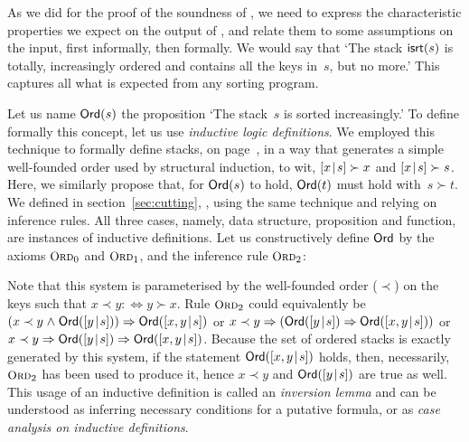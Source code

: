 As we did for the proof of the soundness of 
, we need to express the characteristic
properties we expect on the output of , and relate them to
some assumptions on the input, first informally, then formally. We
would say that `The stack \(\textsf{isrt}(s)\)
is totally, increasingly ordered and contains all the keys in~\(s\),
but no more.'  This captures all what is expected from any sorting
program.

Let us name \(\textsf{Ord}({s})\) the
proposition `The stack~\(s\) is sorted increasingly.' To define
formally this concept, let us use \emph{inductive logic
  definitions}. We employed this
technique to formally define stacks, on page~\pageref{def:stack}, in a
way that generates a simple well\hyp{}founded order used by structural
induction, to wit, \([{x}\!\mid\!{s}] \succ x\) and \([{x}\!\mid\!{s}] \succ
s\). Here, we similarly propose that, for \(\textsf{Ord}({s})\) to hold,
\(\textsf{Ord}({t})\) must hold with~\(s \succ t\). We defined 
in section~\ref{sec:cutting}, , using the same
technique and relying on inference rules. All three cases, namely,
data structure, proposition and function, are instances of inductive
definitions. Let us constructively define \(\textsf{Ord}\) by the
axioms \(\TirName{Ord}_0\) and \(\TirName{Ord}_1\), and the inference
rule \(\TirName{Ord}_2\):\label{def:Ord}
Note that this system is parameterised by the well\hyp{}founded order
(\(\prec\)) on the keys such that \(x \prec y :\Leftrightarrow y \succ
x\). Rule \(\TirName{Ord}_2\) could equivalently be \((x \prec y
\mathrel{\wedge} \textsf{Ord}({[{y}\!\mid\!{s}]})) \Rightarrow
\textsf{Ord}({[{x,y}\!\mid\!{s}]})\) or \(x \prec y \Rightarrow
(\textsf{Ord}({[{y}\!\mid\!{s}]}) \Rightarrow \textsf{Ord}({[{x,y}\!\mid\!{s}]}))\) or
\(x \prec y \Rightarrow \textsf{Ord}({[{y}\!\mid\!{s}]}) \Rightarrow
\textsf{Ord}({[{x,y}\!\mid\!{s}]})\). Because the set of ordered stacks is
exactly generated by this system, if the statement
\(\textsf{Ord}({[{x,y}\!\mid\!{s}]})\) holds, then, necessarily,
\(\TirName{Ord}_2\) has been used to produce it, hence \(x \prec y\)
and \(\textsf{Ord}({[{y}\!\mid\!{s}]})\) are true as well. This usage of an
inductive definition is called an \emph{inversion
  lemma} and can be understood as
inferring necessary conditions for a putative formula, or as
\emph{case analysis on inductive definitions}.


